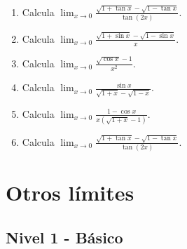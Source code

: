 \documentclass[11pt,a4paper]{article}
\begin{document}
\begin{enumerate}[label=\textbf{E\arabic*.},start=581]
\item Calcula $\displaystyle \lim_{x\to0}\frac{\sqrt{1+\tan x}-\sqrt{1-\tan x}}{\tan(2x)}$.

\item Calcula $\displaystyle \lim_{x\to0}\frac{\sqrt{1+\sin x}-\sqrt{1-\sin x}}{x}$.

\item Calcula $\displaystyle \lim_{x\to0}\frac{\sqrt{\cos x}-1}{x^2}$.

\item Calcula $\displaystyle \lim_{x\to0}\frac{\sin x}{\sqrt{1+x}-\sqrt{1-x}}$.

\item Calcula $\displaystyle \lim_{x\to0}\frac{1-\cos x}{x(\sqrt{1+x}-1)}$.

\item Calcula $\displaystyle \lim_{x\to0}\frac{\sqrt{1+\tan x}-\sqrt{1-\tan x}}{\tan(2x)}$.

\end{enumerate}

\newpage

\section{Otros límites}

\subsection{Nivel 1 - Básico}
\end{document}
